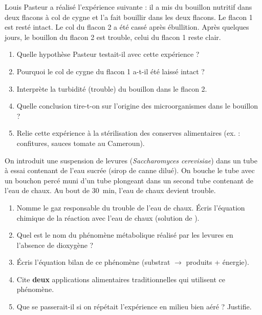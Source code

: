 \documentclass[11pt]{article}
\begin{document}
\begin{exercice}
Louis Pasteur a réalisé l'expérience suivante : il a mis du bouillon nutritif dans deux flacons à col de cygne et l'a fait bouillir dans les deux flacons. Le flacon 1 est resté intact. Le col du flacon 2 a été cassé après ébullition. Après quelques jours, le bouillon du flacon 2 est trouble, celui du flacon 1 reste clair.
\begin{enumerate}
\item Quelle hypothèse Pasteur testait-il avec cette expérience ?
\item Pourquoi le col de cygne du flacon 1 a-t-il été laissé intact ?
\item Interprète la turbidité (trouble) du bouillon dans le flacon 2.
\item Quelle conclusion tire-t-on sur l'origine des microorganismes dans le bouillon ?
\item Relie cette expérience à la stérilisation des conserves alimentaires (ex. : confitures, sauces tomate au Cameroun).
\end{enumerate}
\end{exercice}

\begin{exercice}
On introduit une suspension de levures (\emph{Saccharomyces cerevisiae}) dans un tube à essai contenant de l'eau sucrée (sirop de canne dilué). On bouche le tube avec un bouchon percé muni d'un tube plongeant dans un second tube contenant de l'eau de chaux. Au bout de \SI{30}{min}, l'eau de chaux devient trouble.
\begin{enumerate}
\item Nomme le gaz responsable du trouble de l'eau de chaux. Écris l'équation chimique de la réaction avec l'eau de chaux (solution de ).
\item Quel est le nom du phénomène métabolique réalisé par les levures en l'absence de dioxygène ?
\item Écris l'équation bilan de ce phénomène (substrat $\rightarrow$ produits + énergie).
\item Cite \textbf{deux} applications alimentaires traditionnelles qui utilisent ce phénomène.
\item Que se passerait-il si on répétait l'expérience en milieu bien aéré ? Justifie.
\end{enumerate}
\end{exercice}
\end{document}
